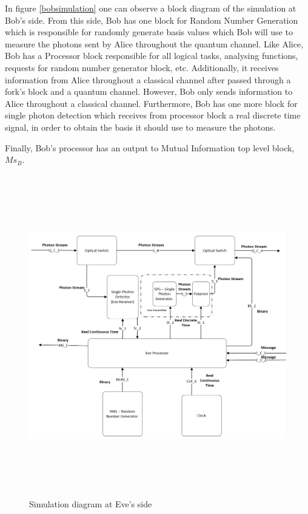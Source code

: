      In figure \ref{bobsimulation} one can observe a block diagram of the simulation at Bob's side. From this side, Bob has one block for Random Number Generation which is responsible for randomly generate basis values which Bob will use to measure the photons sent by Alice throughout the quantum channel. Like Alice, Bob has a Processor block responsible for all logical tasks, analysing functions, requests for random number generator block, etc. Additionally, it receives information from Alice throughout a classical channel after passed through a fork's block and a quantum channel. However, Bob only sends information to Alice throughout a classical channel. Furthermore, Bob has one more block for single photon detection which receives from processor block a real discrete time signal, in order to obtain the basis it should use to measure the photons.

    Finally, Bob's processor has an output to Mutual Information top level block, $Ms_{B}$.



\begin{figure}[h]
	\centering
	\includegraphics[width=1.1\textwidth, height=14cm]{./sdf/bb84_with_discrete_variables/figures/eve_simulation.png}
	\caption{Simulation diagram at Eve's side}\label{evesimulation}
\end{figure}

